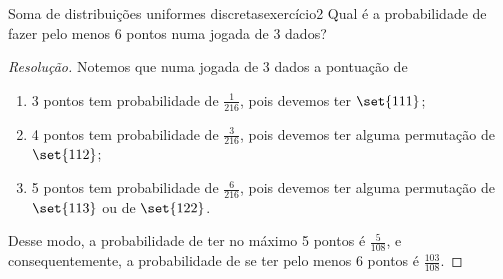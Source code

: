\begin{exercício}{Soma de distribuições uniformes discretas}{exercício2}
    Qual é a probabilidade de fazer pelo menos 6 pontos numa jogada de 3 dados?
\end{exercício}
\begin{proof}[Resolução]
    Notemos que numa jogada de 3 dados a pontuação de
    \begin{enumerate}[label=(\alph*)]
        \item 3 pontos tem probabilidade de \(\frac1{216}\), pois devemos ter \(\set{111}\);
        \item 4 pontos tem probabilidade de \(\frac3{216}\), pois devemos ter alguma permutação de \(\set{112}\);
        \item 5 pontos tem probabilidade de \(\frac6{216}\), pois devemos ter alguma permutação de \(\set{113}\) ou de \(\set{122}\).
    \end{enumerate}
    Desse modo, a probabilidade de ter no máximo 5 pontos é \(\frac{5}{108}\), e consequentemente, a probabilidade de se ter pelo menos 6 pontos é \(\frac{103}{108}\).
\end{proof}
